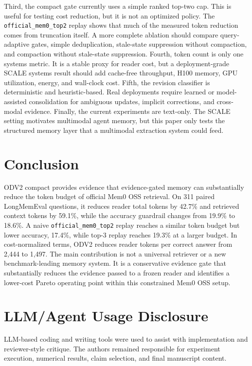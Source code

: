 \documentclass{article}
\begin{document}
Third, the compact gate currently uses a simple ranked top-two cap. This is useful for testing cost reduction, but it is not an optimized policy. The \texttt{official\_mem0\_top2} replay shows that much of the measured token reduction comes from truncation itself. A more complete ablation should compare query-adaptive gates, simple deduplication, stale-state suppression without compaction, and compaction without stale-state suppression. Fourth, token count is only one systems metric. It is a stable proxy for reader cost, but a deployment-grade SCALE systems result should add cache-free throughput, H100 memory, GPU utilization, energy, and wall-clock cost. Fifth, the revision classifier is deterministic and heuristic-based. Real deployments require learned or model-assisted consolidation for ambiguous updates, implicit corrections, and cross-modal evidence. Finally, the current experiments are text-only. The SCALE setting motivates multimodal agent memory, but this paper only tests the structured memory layer that a multimodal extraction system could feed.

\section{Conclusion}

ODV2 compact provides evidence that evidence-gated memory can substantially reduce the token budget of official Mem0 OSS retrieval. On 311 paired LongMemEval questions, it reduces reader total tokens by 42.7\% and retrieved context tokens by 59.1\%, while the accuracy guardrail changes from 19.9\% to 18.6\%. A naive \texttt{official\_mem0\_top2} replay reaches a similar token budget but lower accuracy, 17.4\%, while top-3 replay reaches 19.3\% at a larger budget. In cost-normalized terms, ODV2 reduces reader tokens per correct answer from 2{,}444 to 1{,}497. The main contribution is not a universal retriever or a new benchmark-leading memory system. It is a conservative evidence gate that substantially reduces the evidence passed to a frozen reader and identifies a lower-cost Pareto operating point within this constrained Mem0 OSS setup.

\section*{LLM/Agent Usage Disclosure}

LLM-based coding and writing tools were used to assist with implementation and reviewer-style critique. The authors remained responsible for experiment execution, numerical results, claim selection, and final manuscript content.
\end{document}
